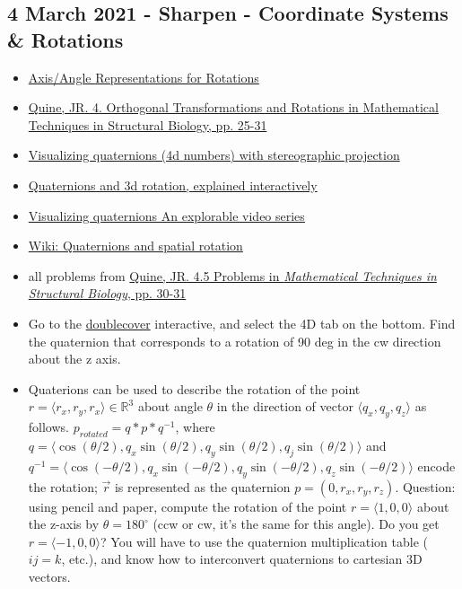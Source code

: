 \documentclass[11pt, oneside]{article}   	%
\begin{document}
\subsection{4 March 2021 - Sharpen - Coordinate Systems \& Rotations}
\begin{itemize}
	\item \href{https://www.coursera.org/lecture/robotics-flight/axis-angle-representations-for-rotations-4hTtQ}{Axis/Angle Representations for Rotations}
	\item \href{https://accio.github.io/AMIDD/assets/2020/04/JRQuine-MathBiophysicsBook.pdf}{Quine, JR. 4. Orthogonal Transformations and Rotations in Mathematical Techniques in Structural Biology, pp. 25-31}
    	\item \href{https://youtu.be/d4EgbgTm0Bg}{Visualizing quaternions (4d numbers) with stereographic projection}
	\item \href{https://youtu.be/zjMuIxRvygQ}{Quaternions and 3d rotation, explained interactively}
	\item \href{https://eater.net/quaternions/}{Visualizing quaternions An explorable video series}
	\item \href{https://en.wikipedia.org/wiki/Quaternions_and_spatial_rotation}{Wiki: Quaternions and spatial rotation}
\end{itemize}
\begin{itemize}
	\item all problems from \href{https://accio.github.io/AMIDD/assets/2020/04/JRQuine-MathBiophysicsBook.pdf}{Quine, JR. 4.5 Problems in {\it Mathematical Techniques in Structural Biology},  pp. 30-31}
	\item Go to the \href{https://eater.net/quaternions/video/doublecover}{doublecover} interactive, and select the 4D tab on the bottom. Find the quaternion that corresponds to a rotation of 90 deg in the cw direction about the z axis.
	\item Quaterions can be used to describe the rotation of the point $ r= \langle r_x,r_y,r_x \rangle \in \mathbb{R}^3$ about angle $\theta$ in the direction of vector $\langle q_x,q_y,q_z \rangle$ as follows. $p_{rotated} = q*p*q^{-1}$, where $q = \langle \cos(\theta/2),q_x\sin(\theta/2),q_y\sin(\theta/2),q_j\sin(\theta/2)\rangle$ and \\ $q^{-1}=\langle \cos(-\theta/2),q_x\sin(-\theta/2),q_y\sin(-\theta/2),q_z\sin(-\theta/2) \rangle$ encode the rotation; $\vec r$ is represented as the quaternion $p=(0,r_x,r_y,r_z)$. Question: using pencil and paper, compute the rotation of the point $ r=\langle1,0,0\rangle$ about the z-axis by $\theta=180^{\circ}$ (ccw or cw, it's the same for this angle). Do you get $r=\langle-1,0,0\rangle$? You will have to use the quaternion multiplication table ($ij=k$, etc.), and know how to interconvert quaternions to cartesian 3D vectors.
\end{itemize}
\end{document}
